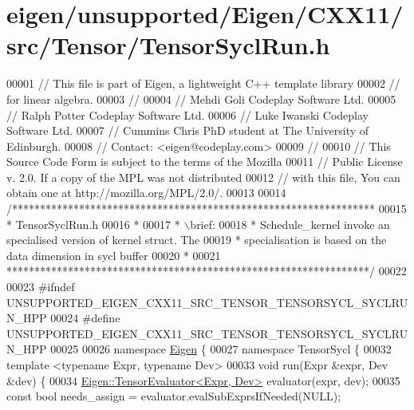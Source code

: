 \hypertarget{eigen_2unsupported_2_eigen_2_c_x_x11_2src_2_tensor_2_tensor_sycl_run_8h_source}{}\section{eigen/unsupported/\+Eigen/\+C\+X\+X11/src/\+Tensor/\+Tensor\+Sycl\+Run.h}
\label{eigen_2unsupported_2_eigen_2_c_x_x11_2src_2_tensor_2_tensor_sycl_run_8h_source}

\begin{DoxyCode}
00001 \textcolor{comment}{// This file is part of Eigen, a lightweight C++ template library}
00002 \textcolor{comment}{// for linear algebra.}
00003 \textcolor{comment}{//}
00004 \textcolor{comment}{// Mehdi Goli    Codeplay Software Ltd.}
00005 \textcolor{comment}{// Ralph Potter  Codeplay Software Ltd.}
00006 \textcolor{comment}{// Luke Iwanski  Codeplay Software Ltd.}
00007 \textcolor{comment}{// Cummins Chris PhD student at The University of Edinburgh.}
00008 \textcolor{comment}{// Contact: <eigen@codeplay.com>}
00009 \textcolor{comment}{//}
00010 \textcolor{comment}{// This Source Code Form is subject to the terms of the Mozilla}
00011 \textcolor{comment}{// Public License v. 2.0. If a copy of the MPL was not distributed}
00012 \textcolor{comment}{// with this file, You can obtain one at http://mozilla.org/MPL/2.0/.}
00013 
00014 \textcolor{comment}{/*****************************************************************}
00015 \textcolor{comment}{ * TensorSyclRun.h}
00016 \textcolor{comment}{ *}
00017 \textcolor{comment}{ * \(\backslash\)brief:}
00018 \textcolor{comment}{ * Schedule\_kernel invoke an specialised version of kernel struct. The}
00019 \textcolor{comment}{ * specialisation is based on the data dimension in sycl buffer}
00020 \textcolor{comment}{ *}
00021 \textcolor{comment}{*****************************************************************/}
00022 
00023 \textcolor{preprocessor}{#ifndef UNSUPPORTED\_EIGEN\_CXX11\_SRC\_TENSOR\_TENSORSYCL\_SYCLRUN\_HPP}
00024 \textcolor{preprocessor}{#define UNSUPPORTED\_EIGEN\_CXX11\_SRC\_TENSOR\_TENSORSYCL\_SYCLRUN\_HPP}
00025 
00026 \textcolor{keyword}{namespace }\hyperlink{namespace_eigen}{Eigen} \{
00027 \textcolor{keyword}{namespace }TensorSycl \{
00032 \textcolor{keyword}{template} <\textcolor{keyword}{typename} Expr, \textcolor{keyword}{typename} Dev>
00033 \textcolor{keywordtype}{void} run(Expr &expr, Dev &dev) \{
00034   \hyperlink{struct_eigen_1_1_tensor_evaluator}{Eigen::TensorEvaluator<Expr, Dev>} evaluator(expr, dev);
00035   \textcolor{keyword}{const} \textcolor{keywordtype}{bool} needs\_assign = evaluator.evalSubExprsIfNeeded(NULL);

\end{DoxyCode}
